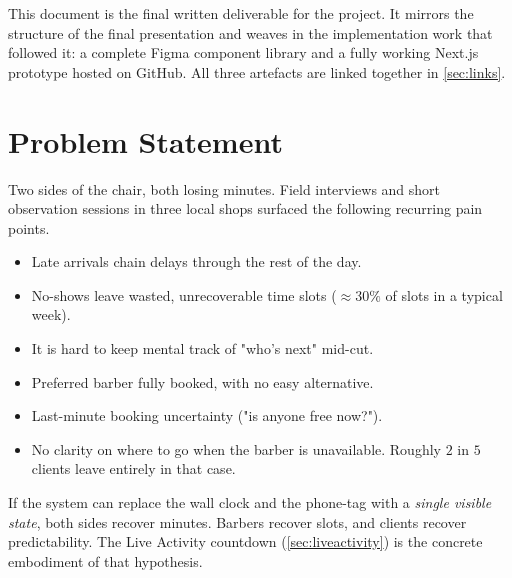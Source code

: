 \documentclass[12pt,a4paper]{article}
\begin{document}
This document is the final written deliverable for the project. It
mirrors the structure of the final presentation and weaves in the
implementation work that followed it: a complete Figma component
library and a fully working Next.js prototype hosted on GitHub. All
three artefacts are linked together in \cref{sec:links}.

\section{Problem Statement}
\label{sec:problem}

Two sides of the chair, both losing minutes. Field interviews and
short observation sessions in three local shops surfaced the
following recurring pain points.

\begin{description}[leftmargin=2.2em,style=nextline]
  \item[From the barber's chair]
    \begin{itemize}[noitemsep]
      \item Late arrivals chain delays through the rest of the day.
      \item No-shows leave wasted, unrecoverable time slots
            ($\approx 30\%$ of slots in a typical week).
      \item It is hard to keep mental track of "who's next" mid-cut.
    \end{itemize}
  \item[From the client's pocket]
    \begin{itemize}[noitemsep]
      \item Preferred barber fully booked, with no easy alternative.
      \item Last-minute booking uncertainty ("is anyone free now?").
      \item No clarity on where to go when the barber is unavailable.
            Roughly $2$ in $5$ clients leave entirely in that case.
    \end{itemize}
\end{description}

\begin{callout}[title=Design hypothesis]
If the system can replace the wall clock and the phone-tag with a
\emph{single visible state}, both sides recover minutes. Barbers
recover slots, and clients recover predictability. The Live Activity
countdown (\cref{sec:liveactivity}) is the concrete embodiment of
that hypothesis.
\end{callout}
\end{document}

